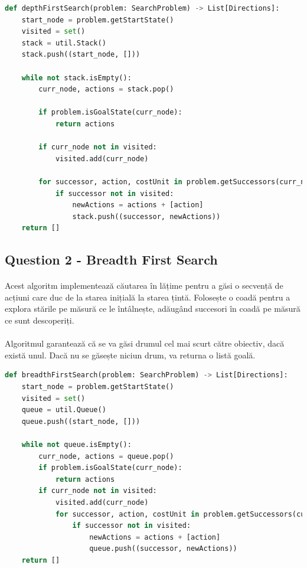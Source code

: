 \documentclass[12pt]{article}
\begin{document}
    \begin{lstlisting}[language=Python]
def depthFirstSearch(problem: SearchProblem) -> List[Directions]:
    start_node = problem.getStartState()
    visited = set()
    stack = util.Stack()
    stack.push((start_node, []))

    while not stack.isEmpty():
        curr_node, actions = stack.pop()

        if problem.isGoalState(curr_node):
            return actions

        if curr_node not in visited:
            visited.add(curr_node)

        for successor, action, costUnit in problem.getSuccessors(curr_node):
            if successor not in visited:
                newActions = actions + [action]
                stack.push((successor, newActions))
    return []
    \end{lstlisting}

    \subsection{Question 2 - Breadth First Search}
    \paragraph{}Acest algoritm implementează căutarea în lățime pentru a găsi o secvență de acțiuni care duc de la starea inițială la starea țintă. Folosește o coadă pentru a explora stările pe măsură ce le întâlnește, adăugând succesori în coadă pe măsură ce sunt descoperiți. 		       \paragraph{}Algoritmul garantează că se va găsi drumul cel mai scurt către obiectiv, dacă există unul. Dacă nu se găsește niciun drum, va returna o listă goală.

    \begin{lstlisting}[language=Python]
def breadthFirstSearch(problem: SearchProblem) -> List[Directions]:
    start_node = problem.getStartState()
    visited = set()
    queue = util.Queue()
    queue.push((start_node, []))

    while not queue.isEmpty():
        curr_node, actions = queue.pop()
        if problem.isGoalState(curr_node):
            return actions
        if curr_node not in visited:
            visited.add(curr_node)
            for successor, action, costUnit in problem.getSuccessors(curr_node):
                if successor not in visited:
                    newActions = actions + [action]
                    queue.push((successor, newActions))
    return []
    \end{lstlisting}
\end{document}
